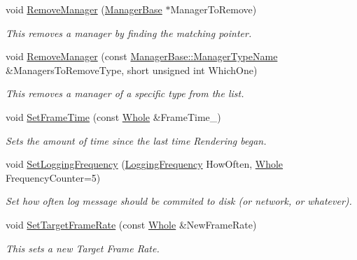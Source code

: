 \begin{DoxyCompactItemize}
void \hyperlink{classphys_1_1World_ae3be85997185935421bf5230651d8e37}{RemoveManager} (\hyperlink{classphys_1_1ManagerBase}{ManagerBase} $\ast$ManagerToRemove)
\begin{DoxyCompactList}\small\item\em This removes a manager by finding the matching pointer. \item\end{DoxyCompactList}\item 
void \hyperlink{classphys_1_1World_ad885d1102ecdd13cc277ee3f7dfcb742}{RemoveManager} (const \hyperlink{classphys_1_1ManagerBase_aaa6ccddf23892eaccb898529414f80a5}{ManagerBase::ManagerTypeName} \&ManagersToRemoveType, short unsigned int WhichOne)
\begin{DoxyCompactList}\small\item\em This removes a manager of a specific type from the list. \item\end{DoxyCompactList}\item 
void \hyperlink{classphys_1_1World_a0168122baeb30d4b90ddecdda46c8fea}{SetFrameTime} (const \hyperlink{namespacephys_a460f6bc24c8dd347b05e0366ae34f34a}{Whole} \&FrameTime\_\-)
\begin{DoxyCompactList}\small\item\em Sets the amount of time since the last time Rendering began. \item\end{DoxyCompactList}\item 
void \hyperlink{classphys_1_1World_ab99299b841603b035eac217924b01f11}{SetLoggingFrequency} (\hyperlink{classphys_1_1World_a8c754464edbb78270fa0ee1e395b963d}{LoggingFrequency} HowOften, \hyperlink{namespacephys_a460f6bc24c8dd347b05e0366ae34f34a}{Whole} FrequencyCounter=5)
\begin{DoxyCompactList}\small\item\em Set how often log message should be commited to disk (or network, or whatever). \item\end{DoxyCompactList}\item 
void \hyperlink{classphys_1_1World_a76dfcde35392291aafd6eb1a64b3c95c}{SetTargetFrameRate} (const \hyperlink{namespacephys_a460f6bc24c8dd347b05e0366ae34f34a}{Whole} \&NewFrameRate)
\begin{DoxyCompactList}\small\item\em This sets a new Target Frame Rate. \item\end{DoxyCompactList}\item 

\end{DoxyCompactItemize}
